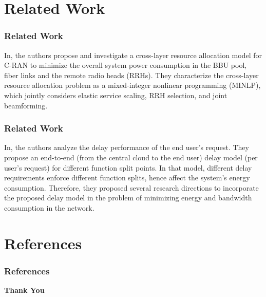 \documentclass[usenames,dvipsnames]{beamer}
\begin{document}
\section{Related Work}
\begin{frame}
  \frametitle{Related Work}
  In\cite{journals/twc/TangTQ15}, the authors propose and investigate a cross-layer resource allocation model for C-RAN to minimize the overall system power consumption in the BBU pool, fiber links and the remote radio heads (RRHs). They characterize the cross-layer resource allocation problem as a mixed-integer nonlinear programming (MINLP), which jointly considers elastic service scaling, RRH selection, and joint beamforming.
\end{frame}
\begin{frame}
  \frametitle{Related Work}
  In\cite{conf/wiopt/AlabbasiC17}, the authors analyze the delay performance of the end user’s request. They propose an end-to-end (from the central cloud to the end user) delay model (per user’s request) for different function split points. In that model, different delay requirements enforce different function splits, hence affect the system’s energy consumption. Therefore, they proposed several research directions to incorporate the proposed delay model in the problem of minimizing energy and bandwidth consumption in the network.
\end{frame}
\section{References}
\begin{frame}
  \frametitle{References}
  \printbibliography
% 
\end{frame}
\begin{frame}{\phantom{}}
  \color{Sepia}
  \centering \Huge\textbf{Thank You}
\end{frame}
\end{document}
